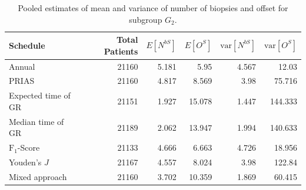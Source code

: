 \begin{table}[!htb]
\centering
\captionsetup{justification=centering}
\caption{Pooled estimates of mean and variance of number of biopsies and offset for subgroup $G_2$.}
\label{table : sim_study_pooled_estimates_G2}
\begin{tabular}{@{}lrrrrr@{}}
\toprule
Schedule           & Total Patients & $E[N^{bS}]$ & $E[O^{S}]$ & $\mbox{var}[N^{bS}]$ & $\mbox{var}[O^S]$ \\ \midrule
Annual              & 21160                  & 5.181           & 5.95                & 4.567          & 12.03              \\
PRIAS              & 21160                  & 4.817           & 8.569               & 3.98           & 75.716             \\
Expected time of GR & 21151                  & 1.927           & 15.078              & 1.447          & 144.333            \\
Median time of GR  & 21189                  & 2.062           & 13.947              & 1.994          & 140.633            \\
$\text{F}_1$-Score           & 21133                  & 4.666           & 6.663               & 4.726          & 18.956             \\
Youden's $J$             & 21167                  & 4.557           & 8.024               & 3.98           & 122.84            \\
Mixed approach     & 21160                  & 3.702           & 10.359              & 1.869          & 60.415             \\ \bottomrule
\end{tabular}
\end{table}

